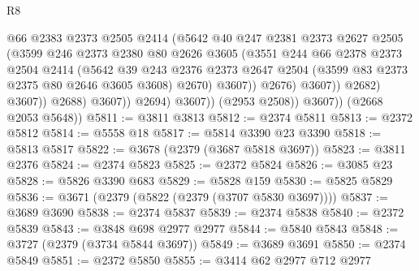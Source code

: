 \begin{lexlean}{R8}
\begin{coremodule}
                                  @66
                                  @2383
                                  @2373
                                  @2505
                                  @2414
                                  (@5642
                                    @40
                                    @247
                                    @2381
                                    @2373
                                    @2627
                                    @2505
                                    (@3599
                                      @246
                                      @2373
                                      @2380
                                      @80
                                      @2626
                                      @3605
                                      (@3551
                                        @244
                                        @66
                                        @2378
                                        @2373
                                        @2504
                                        @2414
                                        (@5642
                                          @39
                                          @243
                                          @2376
                                          @2373
                                          @2647
                                          @2504
                                          (@3599 @83 @2373 @2375 @80 @2646 @3605 @3608)
                                          @2670)
                                        @3607))
                                    @2676)
                                  @3607))
                              @2682)
                            @3607))
                        @2688)
                      @3607))
                  @2694)
                @3607))
            (@2953 @2508))
          @3607))
      (@2668 @2053 @5648))
@5811 := @3811 @3813
@5812 := @2374 @5811
@5813 := @2372 @5812
@5814 := @5558 @18
@5817 := @5814 @3390 @23 @3390
@5818 := @5813 @5817
@5822 := @3678 (@2379 (@3687 @5818 @3697))
@5823 := @3811 @2376
@5824 := @2374 @5823
@5825 := @2372 @5824
@5826 := @3085 @23
@5828 := @5826 @3390 @683
@5829 := @5828 @159
@5830 := @5825 @5829
@5836 := @3671 (@2379 (@5822 (@2379 (@3707 @5830 @3697))))
@5837 := @3689 @3690
@5838 := @2374 @5837
@5839 := @2374 @5838
@5840 := @2372 @5839
@5843 := @3848 @698 @2977 @2977
@5844 := @5840 @5843
@5848 := @3727 (@2379 (@3734 @5844 @3697))
@5849 := @3689 @3691
@5850 := @2374 @5849
@5851 := @2372 @5850
@5855 := @3414 @62 @2977 @712 @2977

\end{coremodule}
\end{lexlean}

